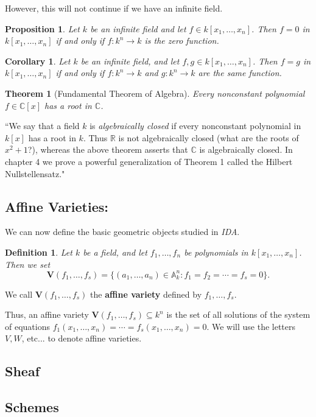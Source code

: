 \documentclass[12pt,reqno]{amsart}
\theoremstyle{plain}
\newtheorem{defi}{Definition}
\newtheorem{theorem}{Theorem}
\newtheorem{prop}{Proposition}
\newtheorem{coro}{Corollary}
\newcommand{\aff}{\mathbb A}
\newcommand{\pring}{k[x_1, \ldots , x_n]}
\newcommand{\rr}{\mathbb R}
\newcommand{\cc}{\mathbb C}
\newcommand{\V}{\mathbf V}
\begin{document}
However, this will not continue if we have an infinite field.
\begin{prop} Let $k$ be an infinite field and let $f \in k [x_1, \ldots, x_n]$. Then $f = 0$ in $k[x_1, \ldots, x_n]$ if and only if $f \colon k^n \to k$ is the zero function.
\end{prop}


\begin{coro} Let $k$ be an infinite field, and let $f, g \in  \pring $. Then $f = g$ in $\pring$ if and only if $f \colon k^n \to k$ and $g \colon k^n \to k$ are the same function.
\end{coro} 

\begin{theorem}[Fundamental Theorem of Algebra] Every nonconstant polynomial $f \in \cc[x]$ has a root in $\cc$.
\end{theorem}

``We say that a field $k$ is \textit{algebraically closed} if every nonconstant polynomial in $k[x]$ has a root in $k$. Thus $\rr$ is not algebraically closed (what are the roots of $x^2 + 1 $?), whereas the above theorem asserts that $\cc$ is algebraically closed. In chapter 4 we prove a powerful generalization of Theorem 1 called the Hilbert Nullstellensatz."

\subsection{Affine Varieties:} 

We can now define the basic geometric objects studied in \textit{IDA}.

\begin{defi} Let $k$ be a field, and let $f_1, \ldots, f_n$ be polynomials in $\pring$. Then we set $$\V (f_1, \ldots , f_s) = \{ (a_1, \ldots, a_n) \in \aff^n_k \colon f_1 = f_2 = \cdots = f_s = 0 \}.$$
\end{defi} 
We call $\V (f_1, \ldots, f_s)$ the \textbf{affine variety} defined by $f_1, \ldots, f_s$.

Thus, an affine variety $\V (f_1, \ldots, f_s) \subseteq k^n $ is the set of all solutions of the system of equations $f_1 (x_1, \ldots, x_n) = \cdots = f_s (x_1, \ldots, x_n ) = 0$. We will use the letters $V, W$, etc... to denote affine varieties.
\subsection{Sheaf}
\subsection{Schemes}
\newpage
\end{document}
